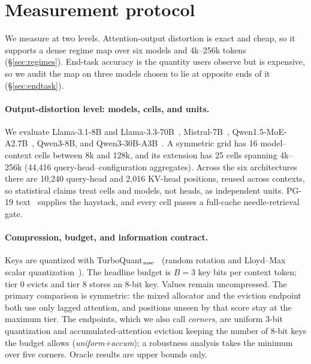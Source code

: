 \documentclass{article}
\theoremstyle{definition}
\begin{document}
\section{Measurement protocol}
\label{sec:protocol}

We measure at two levels.  Attention-output distortion is exact and cheap, so it supports a dense regime map over six models and 4k--256k tokens (\S\ref{sec:regimes}).  End-task accuracy is the quantity users observe but is expensive, so we audit the map on three models chosen to lie at opposite ends of it (\S\ref{sec:endtask}).

\paragraph{Output-distortion level: models, cells, and units.}
We evaluate Llama-3.1-8B and Llama-3.3-70B~\citep{grattafiori2024llama3}, Mistral-7B~\citep{jiang2023mistral}, Qwen1.5-MoE-A2.7B~\citep{qwen2024moe}, Qwen3-8B, and Qwen3-30B-A3B~\citep{yang2025qwen3}.  A symmetric grid has 16 model--context cells between 8k and 128k, and its extension has 25 cells spanning 4k--256k (44,416 query-head--configuration aggregates).  Across the six architectures there are 10,240 query-head and 2,016 KV-head positions, reused across contexts, so statistical claims treat cells and models, not heads, as independent units.  PG-19 text~\citep{rae2020pg19} supplies the haystack, and every cell passes a full-cache needle-retrieval gate.

\paragraph{Compression, budget, and information contract.}
Keys are quantized with TurboQuant$_{\rm mse}$~\citep{zandieh2025turboquant} (random rotation and Lloyd--Max scalar quantization~\citep{lloyd1982least}).  The headline budget is $B=3$ key bits per context token; tier 0 evicts and tier 8 stores an 8-bit key.  Values remain uncompressed.  The primary comparison is symmetric: the mixed allocator and the eviction endpoint both use only lagged attention, and positions unseen by that score stay at the maximum tier.  The endpoints, which we also call \emph{corners}, are uniform 3-bit quantization and accumulated-attention eviction keeping the number of 8-bit keys the budget allows (\emph{uniform+accum}); a robustness analysis takes the minimum over five corners.  Oracle results are upper bounds only.
\end{document}
